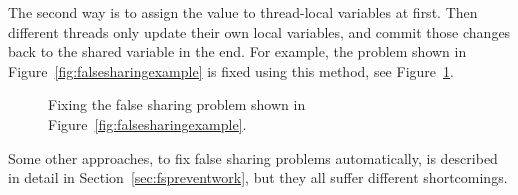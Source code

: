 The second way is to assign the value to thread-local variables at first. Then different threads only update their own local variables, and commit those changes back to the shared variable in the end. For example, the problem shown in Figure~\ref{fig:falsesharingexample} is fixed using this method, see Figure~\ref{fig:falsesharingexamplefix}. 

\begin{figure}[!ht]
{\centering
\fbox{
\subfigure{}
}
\caption{Fixing the false sharing problem shown in Figure~\ref{fig:falsesharingexample}.
\label{fig:falsesharingexamplefix}}
}
\end{figure}

Some other approaches, to fix false sharing problems automatically, is described in detail in Section~\ref{sec:fspreventwork}, but they all suffer different shortcomings. 




